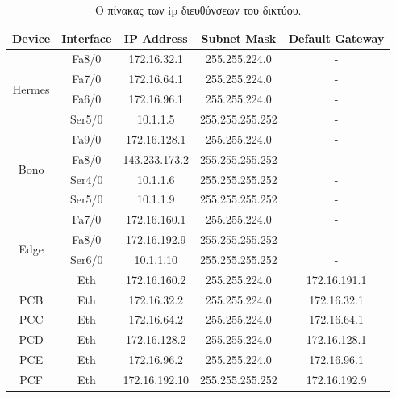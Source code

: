\documentclass{assignment}
\begin{document}
\begin{table}
\begin{minipage}{\textwidth} 
\begin{center}
  \begin{tabular}{|c|c|c|c|c|}
    \hline
    Device & Interface & IP Address & Subnet Mask & Default Gateway \\ \hline
    \multirow{4}{*}{Hermes} &  Fa8/0 & 172.16.32.1 & 255.255.224.0 & - \\ \cline{2-5}
                            &  Fa7/0 & 172.16.64.1 & 255.255.224.0 & - \\ \cline{2-5}
                            &  Fa6/0 & 172.16.96.1 & 255.255.224.0 & - \\ \cline{2-5}
                            &  Ser5/0 & 10.1.1.5 & 255.255.255.252 & - \\ \hline

    \multirow{4}{*}{Bono}   &  Fa9/0 & 172.16.128.1 & 255.255.224.0 & - \\ \cline{2-5}
                            &  Fa8/0 & 143.233.173.2 & 255.255.255.252 & - \\ \cline{2-5}
                            &  Ser4/0 & 10.1.1.6 & 255.255.255.252 & - \\ \cline{2-5}
                            &  Ser5/0 & 10.1.1.9 & 255.255.255.252 & - \\ \hline

    \multirow{4}{*}{Edge}   &  Fa7/0 & 172.16.160.1 & 255.255.224.0 & - \\ \cline{2-5}
                            &  Fa8/0 & 172.16.192.9 & 255.255.255.252 & - \\ \cline{2-5}
                            &  Ser6/0 & 10.1.1.10 & 255.255.255.252 & - \\  \hline

    PCA & Eth & 172.16.160.2 & 255.255.224.0 & 172.16.191.1 \\ \hline
    PCB & Eth & 172.16.32.2 & 255.255.224.0 & 172.16.32.1 \\ \hline
    PCC & Eth & 172.16.64.2 & 255.255.224.0 & 172.16.64.1 \\ \hline
    PCD & Eth & 172.16.128.2 & 255.255.224.0 & 172.16.128.1 \\ \hline
    PCE & Eth & 172.16.96.2 & 255.255.224.0 & 172.16.96.1 \\ \hline
    PCF & Eth & 172.16.192.10 & 255.255.255.252 & 172.16.192.9 \\ \hline
  \end{tabular}
\caption{Ο πίνακας των ip διευθύνσεων του δικτύου.}
\label{table:VLSM_ip}
\end{center}
\end{minipage}
\end{table}
\end{document}
